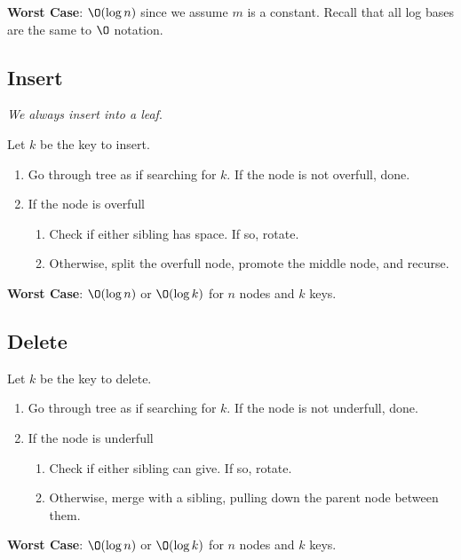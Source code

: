 \documentclass[12pt, letterpaper]{article}
\begin{document}
\begin{multicols*}{3}
        {\bf Worst Case}: $\O(\log n)$ since we assume $m$ is a constant. Recall that all log bases are the same to $\O$ notation.



        \subsection{Insert}
        {\it We always insert into a leaf}.

        Let $k$ be the key to insert.

        \begin{enumerate}
            \item Go through tree as if searching for $k$. If the node is not overfull, done.
            \item If the node is overfull
            \begin{enumerate}[label=\roman*.]
                \item Check if either sibling has space. If so, rotate.
                \item Otherwise, split the overfull node, promote the middle node, and recurse.
            \end{enumerate}
        \end{enumerate}

        {\bf Worst Case}: $\O(\log n)$ or $\O(\log k)$ for $n$ nodes and $k$ keys.

        \subsection{Delete}
        Let $k$ be the key to delete.

        \begin{enumerate}
            \item Go through tree as if searching for $k$. If the node is not underfull, done.
            \item If the node is underfull
            \begin{enumerate}[label=\roman*.]
                \item Check if either sibling can give. If so, rotate.
                \item Otherwise, merge with a sibling, pulling down the parent node between them.
            \end{enumerate}
        \end{enumerate}

        {\bf Worst Case}: $\O(\log n)$ or $\O(\log k)$ for $n$ nodes and $k$ keys.
        






\end{multicols*}
\end{document}
